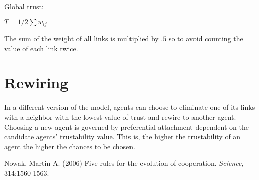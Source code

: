 \documentclass[11pt]{article}
\begin{document}
Global trust:

$T = 1/2 \sum w_{ij}$

The sum of the weight of all links is multiplied by $.5$ so to avoid counting the value of each link twice.\\

\section{Rewiring}

In a different version of the model, agents can choose to eliminate one of its links with a neighbor with the lowest value of trust and rewire to another agent. Choosing a new agent is governed by preferential attachment dependent on the candidate agents' trustability value. This is, the higher the trustability of an agent the higher the chances to be chosen.

\begin{thebibliography}{30}

 Nowak, Martin A. (2006) Five rules for the evolution of cooperation. \textit{Science}, 314:1560-1563.

\end{thebibliography}
\end{document}
